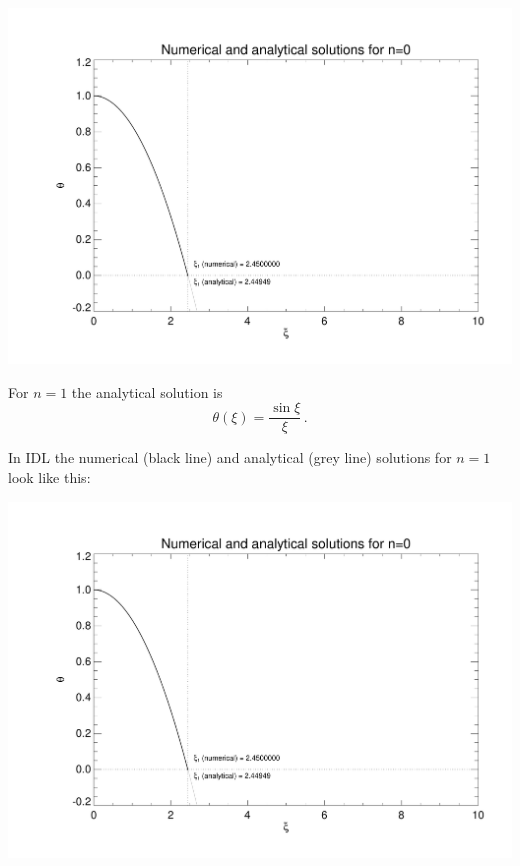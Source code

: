 \documentclass[a4paper,12pt]{article}
\begin{document}
\begin{itemize}
\centerline{\includegraphics[scale=0.6,page=1]{stellar_part2.pdf}}




For $n=1$ the analytical solution is
\begin{equation}
\theta(\xi)=\frac{\sin \xi}{\xi} \, .
\end{equation}

In IDL the numerical (black line) and analytical (grey line) solutions for $n=1$ look like this:

\centerline{\includegraphics[scale=0.6,page=2]{stellar_part2.pdf}}


\end{itemize}
\end{document}
